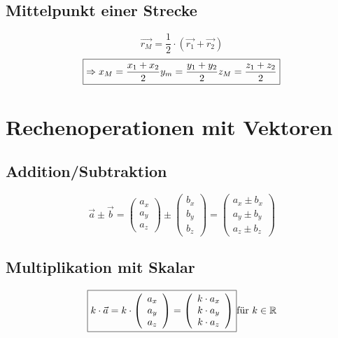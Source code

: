 \subsection{Mittelpunkt einer Strecke}
\[ \boxed{ \vec{r_M} = \frac{1}{2} \cdot (\vec{r_1} + \vec{r_2}) } \]
\[ \boxed{ \Rightarrow x_M = \frac{x_1 + x_2}{2} \\ y_m = \frac{y_1 + y_2}{2} \\ z_M = \frac{z_1 + z_2}{2} } \]

\section{Rechenoperationen mit Vektoren}

\subsection{Addition/Subtraktion}
\[ \boxed{ \vec{a}\pm\vec{b} =  
    \left( 
	  \begin{array}{ccc} 
	    a_x \\ a_y \\ a_z
	  \end{array}
	\right)
	\pm
	\left( 
	  \begin{array}{ccc} 
	    b_x \\ b_y \\ b_z
	  \end{array}
	\right)
	=
	\left( 
	  \begin{array}{ccc} 
	    a_x \pm b_x \\ a_y \pm b_y \\ a_z \pm b_z
	  \end{array}
	\right)
} \]

\subsection{Multiplikation mit Skalar}
\[ \boxed{ k \cdot \vec{a} = k \cdot 
\left( 
	  \begin{array}{ccc} 
	    a_x \\ a_y \\ a_z
	  \end{array}
	\right)
	=
	\left( 
	  \begin{array}{ccc} 
	    k \cdot a_x \\ k \cdot a_y \\ k \cdot a_z
	  \end{array}
	\right)
	} \\ \text{für } k \in \mathbb{R}
\]

